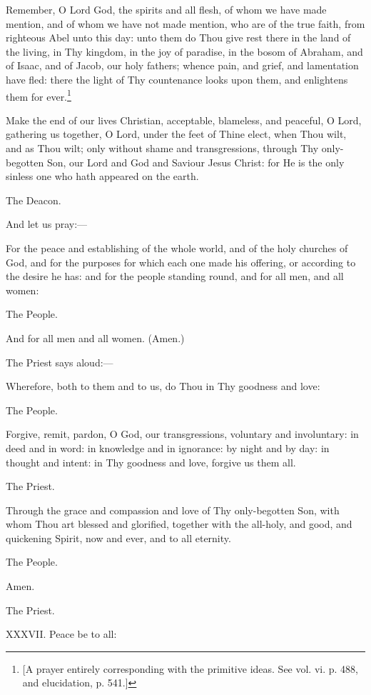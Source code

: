 Remember, O Lord God, the spirits and all flesh, of whom we have made mention, and of whom we have not made mention, who are of the true faith, from righteous Abel unto this day: unto them do Thou give rest there in the land of the living, in Thy kingdom, in the joy of paradise, in the bosom of Abraham, and of Isaac, and of Jacob, our holy fathers; whence pain, and grief, and lamentation have fled: there the light of Thy countenance looks upon them, and enlightens them for ever.\footnote{\par{}  [A prayer entirely corresponding with the primitive ideas. See vol. vi. p. 488, and elucidation, p. 541.]}

Make the end of our lives Christian, acceptable, blameless, and peaceful, O Lord, gathering us together, O Lord, under the feet of Thine elect, when Thou wilt, and as Thou wilt; only without shame and transgressions, through Thy only-begotten Son, our Lord and God and Saviour Jesus Christ: for He is the only sinless one who hath appeared on the earth.

The Deacon.

And let us pray:—

For the peace and establishing of the whole world, and of the holy churches of God, and for the purposes for which each one made his offering, or according to the desire he has: and for the people standing round, and for all men, and all women:

The People.

And for all men and all women. (Amen.)

The Priest says aloud:—

Wherefore, both to them and to us, do Thou in Thy goodness and love:

The People.

Forgive, remit, pardon, O God, our transgressions, voluntary and involuntary: in deed and in word: in knowledge and in ignorance: by night and by day: in thought and intent: in Thy goodness and love, forgive us them all.

The Priest.

Through the grace and compassion and love of Thy only-begotten Son, with whom Thou art blessed and glorified, together with the all-holy, and good, and quickening Spirit, now and ever, and to all eternity.

The People.

Amen.

The Priest.

XXXVII. Peace be to all:

